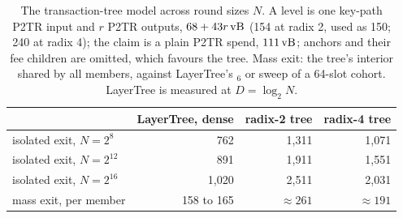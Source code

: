
\begin{table}[tbp]
\centering
\caption{The transaction-tree model across round sizes $N$. A level is one key-path P2TR input and $r$ P2TR outputs, $68 + 43r\,\mathrm{vB}$ (154 at radix 2, used as 150; 240 at radix 4); the claim is a plain P2TR spend, $111\,\mathrm{vB}$; anchors and their fee children are omitted, which favours the tree. Mass exit: the tree's interior shared by all members, against LayerTree's $_6$ or sweep of a 64-slot cohort. LayerTree is measured at $D = \log_2 N$.}
\label{tab:ark}
\setlength{\tabcolsep}{5pt}\scriptsize
\begin{tabular}{@{}lrrr@{}}
\toprule
 & LayerTree, dense & radix-2 tree & radix-4 tree \\
\midrule
isolated exit, $N = 2^{8}$ & 762 & 1{,}311 & 1{,}071 \\
isolated exit, $N = 2^{12}$ & 891 & 1{,}911 & 1{,}551 \\
isolated exit, $N = 2^{16}$ & 1{,}020 & 2{,}511 & 2{,}031 \\
mass exit, per member & 158 to 165 & $\approx 261$ & $\approx 191$ \\
\bottomrule
\end{tabular}
\end{table}
